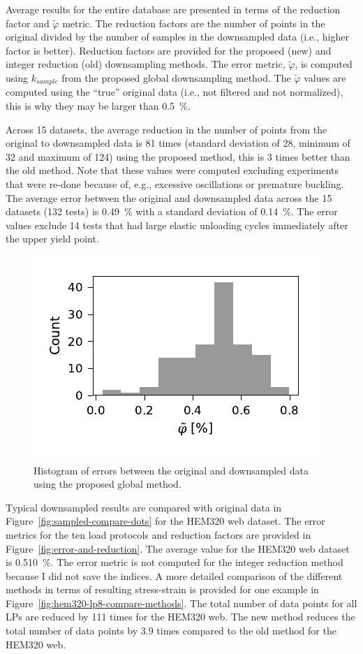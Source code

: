 \documentclass[a4paper,11pt]{article}
\begin{document}
Average results for the entire database are presented in terms of the reduction factor and $\tilde{\varphi}$ metric.
The reduction factors are the number of points in the original divided by the number of samples in the downsampled data (i.e., higher factor is better).
Reduction factors are provided for the proposed (new) and integer reduction (old) downsampling methods.
The error metric, $\tilde{\varphi}$, is computed using $k_{sample}$ from the proposed global downsampling method.
The $\tilde{\varphi}$ values are computed using the ``true'' original data (i.e., not filtered and not normalized), this is why they may be larger than 0.5~\%.

Across 15 datasets, the average reduction in the number of points from the original to downsampled data is 81 times (standard deviation of 28, minimum of 32 and maximum of 124) using the proposed method, this is 3 times better than the old method.
Note that these values were computed excluding experiments that were re-done because of, e.g., excessive oscillations or premature buckling.
The average error between the original and downsampled data across the 15 datasets (132 tests) is 0.49~\% with a standard deviation of 0.14~\%.
The error values exclude 14 tests that had large elastic unloading cycles immediately after the upper yield point.

\begin{figure}
    \centering
    \includegraphics{error_histogram.pdf}
    \caption{Histogram of errors between the original and downsampled data using the proposed global method.}
    \label{fig:histogram-error-all-datasets}
\end{figure}

Typical downsampled results are compared with original data in Figure~\ref{fig:sampled-compare-dots} for the HEM320 web dataset.
The error metrics for the ten load protocols and reduction factors are provided in Figure~\ref{fig:error-and-reduction}.
The average value for the HEM320 web dataset is 0.510~\%.
The error metric is not computed for the integer reduction method because I did not save the indices.
A more detailed comparison of the different methods in terms of resulting stress-strain is provided for one example in Figure~\ref{fig:hem320-lp8-compare-methods}.
The total number of data points for all LPs are reduced by 111 times for the HEM320 web.
The new method reduces the total number of data points by 3.9 times compared to the old method for the HEM320 web.
\end{document}
